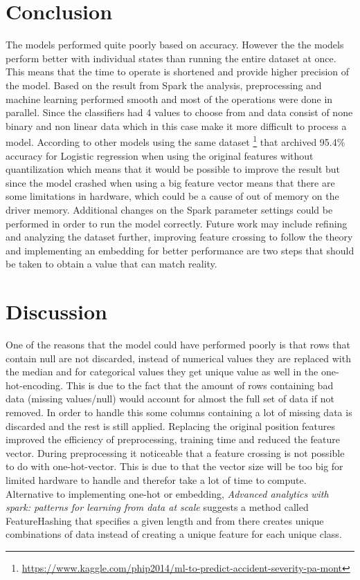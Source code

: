 \documentclass[../main.tex]{subfiles}
\begin{document}
\section{Conclusion}
The models performed quite poorly based on accuracy. However the the models perform better with individual states than running the entire dataset at once. This means that the time to operate is shortened and provide higher precision of the model. Based on the result from Spark the analysis, preprocessing and machine learning performed smooth and most of the operations were done in parallel. Since the classifiers had 4 values to choose from and data consist of none binary and non linear data which in this case make it more difficult to process a model. According to other models using the same dataset \footnote {\url{https://www.kaggle.com/phip2014/ml-to-predict-accident-severity-pa-mont}} that archived 95.4\% accuracy for Logistic regression when using the original features without quantilization which means that it would be possible to improve the result but since the model crashed when using a big feature vector means that there are some limitations in hardware, which could be a cause of out of memory on the driver memory. Additional changes on the Spark parameter settings could be performed in order to run the model correctly. Future work may include refining and analyzing the dataset further, improving feature crossing to follow the theory and implementing an embedding for better performance are two steps that should be taken to obtain a value that can match reality.

\section{Discussion}
One of the reasons that the model could have performed poorly is that rows that contain null are not discarded, instead of numerical values they are replaced with the median and for categorical values they get unique value as well in the one-hot-encoding. This is due to the fact that the amount of rows containing bad data (missing values/null) would account for almost the full set of data if not removed. In order to handle this some columns containing a lot of missing data is discarded and the rest is still applied. Replacing the original position features improved the efficiency of preprocessing, training time and reduced the feature vector. During preprocessing it noticeable that a feature crossing is not possible to do with one-hot-vector. This is due to that the vector size will be too big for limited hardware to handle and therefor take a lot of time to compute. Alternative to implementing one-hot or embedding, \textit{Advanced analytics with spark: patterns for learning from data at scale} \cite{ryza2017advanced} suggests a method called FeatureHashing that specifies a given length and from there creates unique combinations of data instead of creating a unique feature for each unique class.
\end{document}
